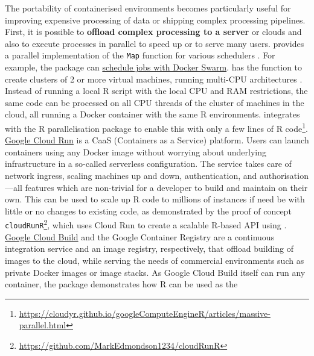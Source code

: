 The portability of containerised environments becomes particularly
useful for improving expensive processing of data or shipping complex
processing pipelines. First, it is possible to \textbf{offload complex
processing to a server} or clouds and also to execute processes in
parallel to speed up or to serve many users.
\textbf{} provides a parallel implementation of the
\texttt{Map} function for various schedulers \citep{Lang2017batchtools}.
For example, the package can
\href{https://mllg.github.io/batchtools/reference/makeClusterFunctionsDocker.html}{schedule
jobs with Docker Swarm}. \textbf{} has the
function  to create clusters of 2 or more
virtual machines, running multi-CPU architectures
\citep{googleComputeEngineR_2019}. Instead of running a local R script
with the local CPU and RAM restrictions, the same code can be processed
on all CPU threads of the cluster of machines in the cloud, all running
a Docker container with the same R environments.
 integrates with the R parallelisation package
 \citep{cran_future} to enable this with only a few
lines of R
code\footnote{\href{https://cloudyr.github.io/googleComputeEngineR/articles/massive-parallel.html}{https://cloudyr.github.io/googleComputeEngineR/articles/massive-parallel.html}}.
\href{https://cloud.run}{Google Cloud Run} is a CaaS (Containers as a
Service) platform. Users can launch containers using any Docker image
without worrying about underlying infrastructure in a so-called
serverless configuration. The service takes care of network ingress,
scaling machines up and down, authentication, and authorisation---all
features which are non-trivial for a developer to build and maintain on
their own. This can be used to scale up R code to millions of instances
if need be with little or no changes to existing code, as demonstrated
by the proof of concept
\texttt{cloudRunR}\footnote{\href{https://github.com/MarkEdmondson1234/cloudRunR}{https://github.com/MarkEdmondson1234/cloudRunR}},
which uses Cloud Run to create a scalable R-based API using
 \citep{cran_plumber}.
\href{https://cloud.google.com/cloud-build/}{Google Cloud Build} and the
Google Container Registry are a continuous integration service and an
image registry, respectively, that offload building of images to the
cloud, while serving the needs of commercial environments such as
private Docker images or image stacks. As Google Cloud Build itself can
run any container, the package 
\citep{cran:googleCloudRunner} demonstrates how R can be used as the
